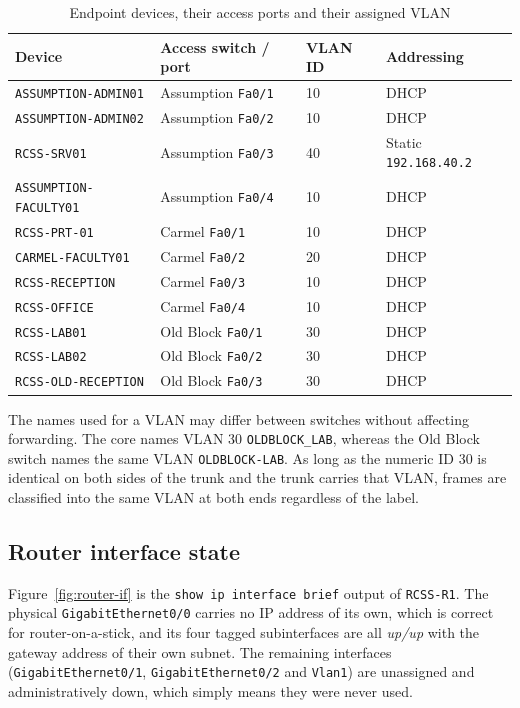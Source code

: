 \documentclass[11pt,a4paper]{article}
\newcommand{\figref}[1]{Figure~\ref{#1}}
\begin{document}
\begin{table}[H]
\centering
\small
\caption{Endpoint devices, their access ports and their assigned VLAN}
\label{tab:endpoints}
\begin{tabular}{@{}L{0.30\textwidth} L{0.17\textwidth} L{0.19\textwidth} L{0.22\textwidth}@{}}
\toprule
\textbf{Device} & \textbf{Access switch / port} & \textbf{VLAN ID} & \textbf{Addressing} \\
\midrule
\texttt{ASSUMPTION-ADMIN01}      & Assumption \texttt{Fa0/1} & 10 & DHCP \\
\texttt{ASSUMPTION-ADMIN02}      & Assumption \texttt{Fa0/2} & 10 & DHCP \\
\texttt{RCSS-SRV01}              & Assumption \texttt{Fa0/3} & 40 & Static \texttt{192.168.40.2} \\
\texttt{ASSUMPTION-FACULTY01}    & Assumption \texttt{Fa0/4} & 10 & DHCP \\
\texttt{RCSS-PRT-01}             & Carmel \texttt{Fa0/1}    & 10 & DHCP \\
\texttt{CARMEL-FACULTY01}        & Carmel \texttt{Fa0/2}    & 20 & DHCP \\
\texttt{RCSS-RECEPTION}          & Carmel \texttt{Fa0/3}    & 10 & DHCP \\
\texttt{RCSS-OFFICE}             & Carmel \texttt{Fa0/4}    & 10 & DHCP \\
\texttt{RCSS-LAB01}              & Old Block \texttt{Fa0/1} & 30 & DHCP \\
\texttt{RCSS-LAB02}              & Old Block \texttt{Fa0/2} & 30 & DHCP \\
\texttt{RCSS-OLD-RECEPTION}      & Old Block \texttt{Fa0/3} & 30 & DHCP \\
\bottomrule
\end{tabular}
\end{table}

\noindent
The names used for a VLAN may differ between switches without affecting forwarding. The
core names VLAN 30 \texttt{OLDBLOCK\_LAB}, whereas the Old Block switch names the same
VLAN \texttt{OLDBLOCK-LAB}. As long as the numeric ID 30 is identical on both sides of
the trunk and the trunk carries that VLAN, frames are classified into the same VLAN at
both ends regardless of the label.

\subsection{Router interface state}

\figref{fig:router-if} is the \texttt{show ip interface brief} output of
\texttt{RCSS-R1}. The physical \texttt{GigabitEthernet0/0} carries no IP address of its
own, which is correct for router-on-a-stick, and its four tagged subinterfaces are all
\textit{up/up} with the gateway address of their own subnet. The remaining interfaces
(\texttt{GigabitEthernet0/1}, \texttt{GigabitEthernet0/2} and \texttt{Vlan1}) are
unassigned and administratively down, which simply means they were never used.
\end{document}
